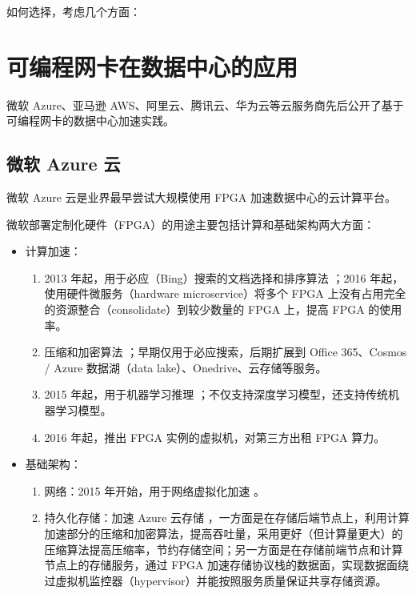 如何选择，考虑几个方面：
\fi

\section{可编程网卡在数据中心的应用}
\label{background:sec:application}

微软 Azure、亚马逊 AWS、阿里云、腾讯云、华为云等云服务商先后公开了基于可编程网卡的数据中心加速实践。

\subsection{微软 Azure 云}

微软 Azure 云是业界最早尝试大规模使用 FPGA 加速数据中心的云计算平台。

微软部署定制化硬件（FPGA）的用途主要包括计算和基础架构两大方面：

\begin{itemize}
	\item 计算加速：
	\begin{enumerate}
		\item 2013 年起，用于必应（Bing）搜索的文档选择和排序算法 \cite{putnam2014reconfigurable}；2016 年起，使用硬件微服务（hardware microservice）将多个 FPGA 上没有占用完全的资源整合（consolidate）到较少数量的 FPGA 上，提高 FPGA 的使用率。
		\item 压缩和加密算法 \cite{a-scalable-high-bandwidth-architecture-for-lossless-compression-on-fpgas}；早期仅用于必应搜索，后期扩展到 Office 365、Cosmos / Azure 数据湖（data lake）、Onedrive、云存储等服务。
		\item 2015 年起，用于机器学习推理 \cite{accelerating-deep-convolutional-neural-networks-using-specialized-hardware,toward-accelerating-deep-learning-scale-using-specialized-hardware-datacenter,serving-dnns-real-time-datacenter-scale-project-brainwave,a-configurable-cloud-scale-dnn-processor-for-real-time-ai}；不仅支持深度学习模型，还支持传统机器学习模型。
		\item 2016 年起，推出 FPGA 实例的虚拟机，对第三方出租 FPGA 算力。
	\end{enumerate}
	\item 基础架构：
	\begin{enumerate}
		\item 网络：2015 年开始，用于网络虚拟化加速 \cite{smartnic}。
		\item 持久化存储：加速 Azure 云存储 \cite{calder2011windows}，一方面是在存储后端节点上，利用计算加速部分的压缩和加密算法，提高吞吐量，采用更好（但计算量更大）的压缩算法提高压缩率，节约存储空间；另一方面是在存储前端节点和计算节点上的存储服务，通过 FPGA 加速存储协议栈的数据面，实现数据面绕过虚拟机监控器（hypervisor）并能按照服务质量保证共享存储资源。
	\end{enumerate}
\end{itemize}


